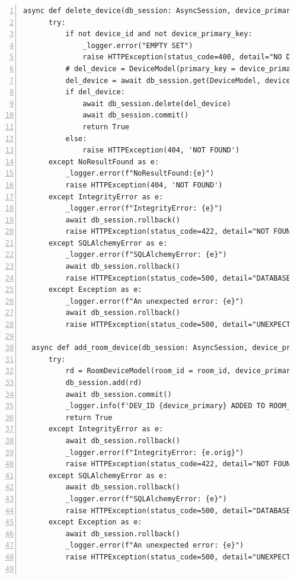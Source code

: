 \documentclass[12pt, letterpaper]{article}
\begin{document}
\begin{lstlisting}[frame=single, style=py, numbers=left, label={lst:dbqueries}, caption={db: queries.py}]
  async def delete_device(db_session: AsyncSession, device_primary_key: int, device_id: str = None):
      try:
          if not device_id and not device_primary_key:
              _logger.error("EMPTY SET")
              raise HTTPException(status_code=400, detail="NO DEVICE DATA PROVIDED")
          # del_device = DeviceModel(primary_key = device_primary_key, dev_id = device_id)
          del_device = await db_session.get(DeviceModel, device_primary_key)
          if del_device:
              await db_session.delete(del_device)
              await db_session.commit()
              return True
          else:
              raise HTTPException(404, 'NOT FOUND')
      except NoResultFound as e:
          _logger.error(f"NoResultFound:{e}")
          raise HTTPException(404, 'NOT FOUND')
      except IntegrityError as e:
          _logger.error(f"IntegrityError: {e}")
          await db_session.rollback()
          raise HTTPException(status_code=422, detail="NOT FOUND")
      except SQLAlchemyError as e:
          _logger.error(f"SQLAlchemyError: {e}")
          await db_session.rollback()
          raise HTTPException(status_code=500, detail="DATABASE ERROR")
      except Exception as e:
          _logger.error(f"An unexpected error: {e}")
          await db_session.rollback()
          raise HTTPException(status_code=500, detail="UNEXPECTED DATABASE ERROR")
      
  async def add_room_device(db_session: AsyncSession, device_primary, room_id):
      try:
          rd = RoomDeviceModel(room_id = room_id, device_primary = device_primary)
          db_session.add(rd)
          await db_session.commit()
          _logger.info(f'DEV_ID {device_primary} ADDED TO ROOM_ID {room_id}')
          return True
      except IntegrityError as e:
          await db_session.rollback()
          _logger.error(f"IntegrityError: {e.orig}")
          raise HTTPException(status_code=422, detail="NOT FOUND")
      except SQLAlchemyError as e:
          await db_session.rollback()
          _logger.error(f"SQLAlchemyError: {e}")
          raise HTTPException(status_code=500, detail="DATABASE ERROR")
      except Exception as e:
          await db_session.rollback()
          _logger.error(f"An unexpected error: {e}")
          raise HTTPException(status_code=500, detail="UNEXPECTED DATABASE ERROR")
  

\end{lstlisting}
\end{document}
